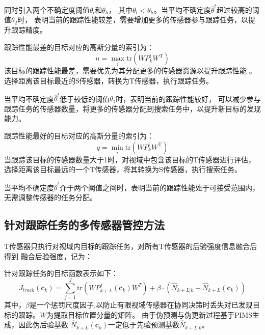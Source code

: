 同时引入两个不确定度阈值$\theta_l$和$\theta_h$，
其中$\theta_l<\theta_h$。当平均不确定度$\overline{\theta}^t$超过较高的阈值$\theta_2$时，
表明当前的跟踪性能较差，需要增加更多的传感器参与跟踪任务，以提升跟踪精度。

跟踪性能最差的目标对应的高斯分量的索引为：
\begin{equation}
n=\max_{i}\mathrm{tr}\left(WP_{k}^{i}W^{\mathrm{T}}\right)
\end{equation} 
该目标的跟踪性能最差，需要优先为其分配更多的传感器资源以提升跟踪性能
。选择距离该目标最近的S传感器，转换为T传感器，执行跟踪任务。

当平均不确定度$\overline{\theta}^t$低于较低的阈值$\theta_1$时，表明当前的跟踪性能较好，
可以减少参与跟踪任务的传感器数量，将更多的传感器分配到搜索任务中，以提升新目标的发现能力。

跟踪性能最好的目标对应的高斯分量的索引为：
\begin{equation}
q=\min_{i}\mathrm{tr}\left(WP_{k}^{i}W^{\mathrm{T}}\right)
\end{equation} 
当跟踪该目标的传感器数量大于1时，对视域中包含该目标的T传感器进行评估，
选择距离该目标最远的一个T传感器，将其转换为S传感器，执行搜索任务。

当平均不确定度$\overline{\theta}^t$介于两个阈值之间时，表明当前的跟踪性能处于可接受范围内，
无需调整传感器的任务分配。

\subsection{针对跟踪任务的多传感器管控方法}
T传感器只执行对视域内目标的跟踪任务，对所有T传感器的后验强度信息融合后得到
融合后验强度，记为：

针对跟踪任务的目标函数表示如下：
\begin{equation}
J_{track}(\mathbf{c}_k)=\sum_{j=1}^{J}\mathrm{tr}\left(WP_{k+L}^j(\mathbf{c}_k)W^T\right)+\beta\cdot\left(\hat{N}_{k+L|k}-\hat{N}_{k+L}(\mathbf{c}_k)\right)
\end{equation}
其中，$\beta$是一个惩罚尺度因子,以防止有限视域传感器在协同决策时丢失对已发现目标的跟踪。$W$为提取目标位置分量的矩阵。
由于伪预测与伪更新过程基于PIMS生成，因此伪后验基数
$\hat{N}_{k+L}(\mathbf{c}_k)$一定低于先验预测基数$\hat{N}_{k+L|k}$。


